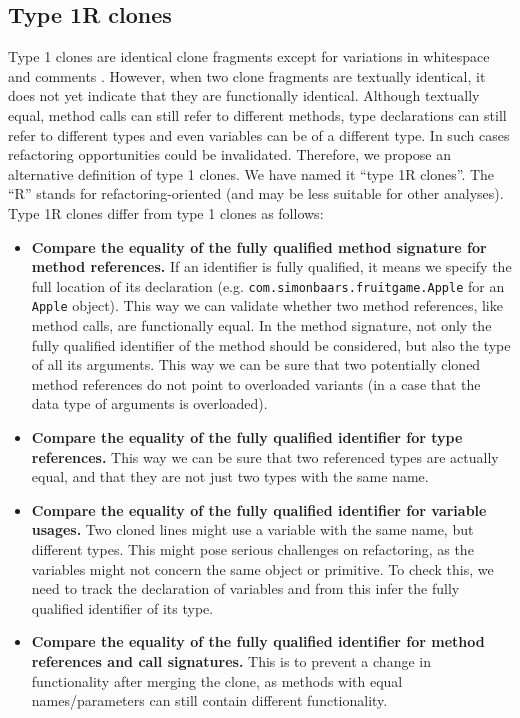 \documentclass[a4paper]{article}
\begin{document}
\subsection{Type 1R clones} \label{chap:type1clones}
Type 1 clones are identical clone fragments except for variations in whitespace and comments \cite{roy2007survey}. However, when two clone fragments are textually identical, it does not yet indicate that they are functionally identical. Although textually equal, method calls can still refer to different methods, type declarations can still refer to different types and even variables can be of a different type. In such cases refactoring opportunities could be invalidated. Therefore, we propose an alternative definition of type 1 clones. We have named it ``type 1R clones''. The ``R'' stands for refactoring-oriented (and may be less suitable for other analyses). Type 1R clones differ from type 1 clones as follows:
\begin{itemize}
  \item \textbf{Compare the equality of the fully qualified method signature for method references.} If an identifier is fully qualified, it means we specify the full location of its declaration (e.g. \texttt{com.simonbaars.fruitgame.Apple} for an \texttt{Apple} object). This way we can validate whether two method references, like method calls, are functionally equal. In the method signature, not only the fully qualified identifier of the method should be considered, but also the type of all its arguments. This way we can be sure that two potentially cloned method references do not point to overloaded variants (in a case that the data type of arguments is overloaded).
  \item \textbf{Compare the equality of the fully qualified identifier for type references.} This way we can be sure that two referenced types are actually equal, and that they are not just two types with the same name.
  \item \textbf{Compare the equality of the fully qualified identifier for variable usages.} Two cloned lines might use a variable with the same name, but different types. This might pose serious challenges on refactoring, as the variables might not concern the same object or primitive. To check this, we need to track the declaration of variables and from this infer the fully qualified identifier of its type.
  \item \textbf{Compare the equality of the fully qualified identifier for method references and call signatures.} This is to prevent a change in functionality after merging the clone, as methods with equal names/parameters can still contain different functionality.
\end{itemize}
\end{document}
